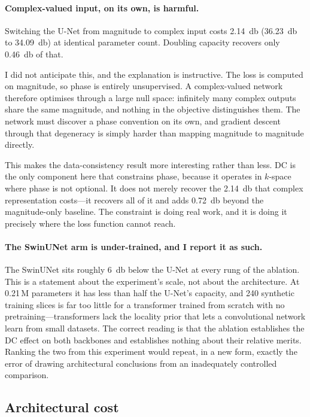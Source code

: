 \documentclass[11pt]{article}
\begin{document}
\paragraph{Complex-valued input, on its own, is harmful.} Switching the U-Net
from magnitude to complex input costs \SI{2.14}{\decibel}
(\SI{36.23}{\decibel} to \SI{34.09}{\decibel}) at identical parameter count.
Doubling capacity recovers only \SI{0.46}{\decibel} of that.

I did not anticipate this, and the explanation is instructive. The loss is
computed on magnitude, so phase is entirely unsupervised. A complex-valued
network therefore optimises through a large null space: infinitely many complex
outputs share the same magnitude, and nothing in the objective distinguishes
them. The network must discover a phase convention on its own, and gradient
descent through that degeneracy is simply harder than mapping magnitude to
magnitude directly.

This makes the data-consistency result more interesting rather than less. DC is
the only component here that constrains phase, because it operates in $k$-space
where phase is not optional. It does not merely recover the
\SI{2.14}{\decibel} that complex representation costs---it recovers all of it
and adds \SI{0.72}{\decibel} beyond the magnitude-only baseline. The
constraint is doing real work, and it is doing it precisely where the loss
function cannot reach.

\paragraph{The SwinUNet arm is under-trained, and I report it as such.} The
SwinUNet sits roughly \SI{6}{\decibel} below the U-Net at every rung of the
ablation. This is a statement about the experiment's scale, not about the
architecture. At 0.21\,M parameters it has less than half the
U-Net's capacity, and 240 synthetic training slices is far too little for a
transformer trained from scratch with no pretraining---transformers lack the
locality prior that lets a convolutional network learn from small datasets.
The correct reading is that the ablation establishes the DC effect on both
backbones and establishes nothing about their relative merits. Ranking the two
from this experiment would repeat, in a new form, exactly the error of drawing
architectural conclusions from an inadequately controlled comparison.

\subsection{Architectural cost}
\end{document}
